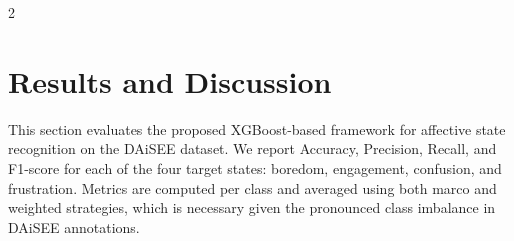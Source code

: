 \begin{multicols}{2}

  \section{Results and Discussion}
  \label{sec:results}

  This section evaluates the proposed XGBoost-based framework for affective state recognition on the DAiSEE dataset. We report Accuracy, Precision, Recall, and F1-score for each of the four target states: boredom, engagement, confusion, and frustration. Metrics are computed per class and averaged using both marco and weighted strategies, which is necessary given the pronounced class imbalance in DAiSEE annotations.


\end{multicols}
